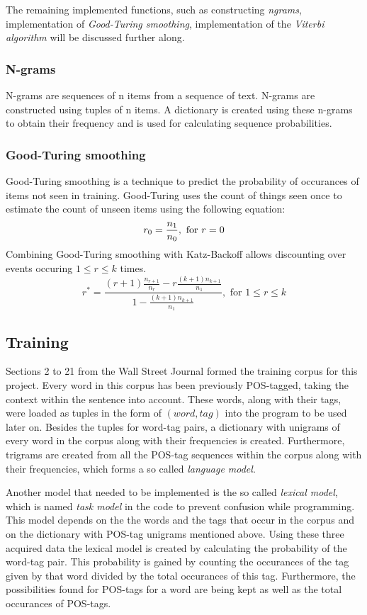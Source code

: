 \documentclass[10pt, a4paper]{article}
\begin{document}
The remaining implemented functions, such as constructing \textit{ngrams}, implementation of \textit{Good-Turing smoothing}, implementation of the \textit{Viterbi algorithm} will be discussed further along.

\subsubsection*{N-grams}
N-grams are sequences of n items from a sequence of text. N-grams are constructed using tuples of n items. A dictionary is created using these n-grams to obtain their frequency and is used for calculating sequence probabilities.

\subsubsection*{Good-Turing smoothing}
Good-Turing smoothing is a technique to predict the probability of occurances of items not seen in training. Good-Turing uses the count of things seen once to estimate the count of unseen items using the following equation:
\begin{equation}
r_0 = \frac{n_1}{n_0}, \text{ for }r = 0\\
\end{equation}
Combining Good-Turing smoothing with Katz-Backoff allows discounting over events occuring $1 \leq r \leq k$ times.
\begin{equation}
r^* = \frac{(r+1)\frac{n_{r+1}}{n_r}-r\frac{(k+1)n_{k+1}}{n_1}}{1-\frac{(k+1)n_{k+1}}{n_1}}, \text{ for } 1 \leq r \leq k
\end{equation}

\subsection*{Training}
Sections 2 to 21 from the Wall Street Journal formed the training corpus for this project. Every word in this corpus has been previously POS-tagged, taking the context within the sentence into account. These words, along with their tags, were loaded as tuples in the form of $(word, tag)$ into the program to be used later on. Besides the tuples for word-tag pairs, a dictionary with unigrams of every word in the corpus along with their frequencies is created. Furthermore, trigrams are created from all the POS-tag sequences within the corpus along with their frequencies, which forms a so called \textit{language model}. 

Another model that needed to be implemented is the so called \textit{lexical model}, which is named \textit{task model} in the code to prevent confusion while programming. This model depends on the the words and the tags that occur in the corpus and on the dictionary with POS-tag unigrams mentioned above. Using these three acquired data the lexical model is created by calculating the probability of the word-tag pair. This probability is gained by counting the occurances of the tag given by that word divided by the total occurances of this tag. Furthermore, the possibilities found for POS-tags for a word are being kept as well as the total occurances of POS-tags.
\end{document}
